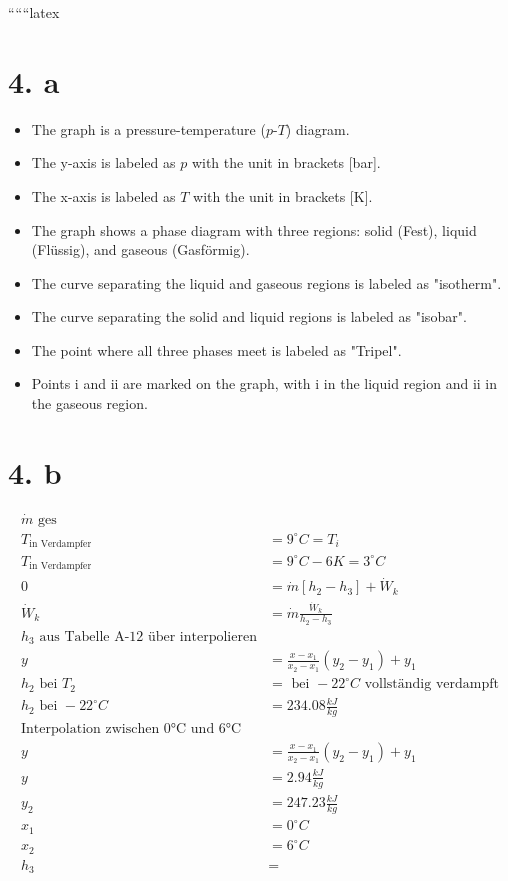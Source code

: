 
``````latex


\section*{4. a}

\begin{itemize}
    \item The graph is a pressure-temperature ($p$-$T$) diagram.
    \item The y-axis is labeled as $p$ with the unit in brackets [bar].
    \item The x-axis is labeled as $T$ with the unit in brackets [K].
    \item The graph shows a phase diagram with three regions: solid (Fest), liquid (Flüssig), and gaseous (Gasförmig).
    \item The curve separating the liquid and gaseous regions is labeled as "isotherm".
    \item The curve separating the solid and liquid regions is labeled as "isobar".
    \item The point where all three phases meet is labeled as "Tripel".
    \item Points i and ii are marked on the graph, with i in the liquid region and ii in the gaseous region.
\end{itemize}

\section*{4. b}

\begin{align*}
    \dot{m} \text{ ges} \\
    T_{\text{in Verdampfer}} &= 9^\circ C = T_i \\
    T_{\text{in Verdampfer}} &= 9^\circ C - 6 K = 3^\circ C \\
    0 &= \dot{m} \left[ h_2 - h_3 \right] + \dot{W}_k \\
    \dot{W}_k &= \dot{m} \frac{\dot{W}_k}{h_2 - h_3} \\
    h_3 \text{ aus Tabelle A-12 über interpolieren} \\
    y &= \frac{x - x_1}{x_2 - x_1} (y_2 - y_1) + y_1 \\
    h_2 \text{ bei } T_2 &= \text{ bei } -22^\circ C \text{ vollständig verdampft} \\
    h_2 \text{ bei } -22^\circ C &= 234.08 \frac{kJ}{kg} \\
    \text{Interpolation zwischen 0°C und 6°C} \\
    y &= \frac{x - x_1}{x_2 - x_1} (y_2 - y_1) + y_1 \\
    y &= 2.94 \frac{kJ}{kg} \\
    y_2 &= 247.23 \frac{kJ}{kg} \\
    x_1 &= 0^\circ C \\
    x_2 &= 6^\circ C \\
    h_3 &= 
\end{align*}

